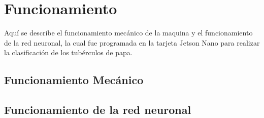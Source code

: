 	\section{Funcionamiento}
	Aquí se describe el funcionamiento mecánico de la maquina y el funcionamiento de la red neuronal, la cual fue programada en la tarjeta Jetson Nano para realizar la clasificación de los tubérculos de papa.
	
	\subsection{Funcionamiento Mecánico}
	
	\subsection{Funcionamiento de la red neuronal}		













